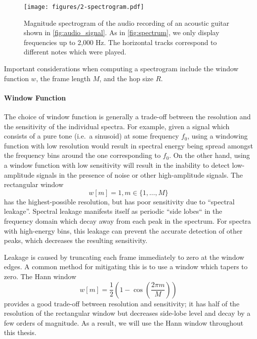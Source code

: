 \begin{figure}
  \centering
  \texttt{[image: figures/2-spectrogram.pdf]}
  \caption[Magnitude spectrogram of the acoustic guitar recording]{Magnitude spectrogram of the audio recording of an acoustic guitar shown in \cref{fig:audio_signal}.
  As in \cref{fig:spectrum}, we only display frequencies up to 2,000 Hz.
  The horizontal tracks correspond to different notes which were played.}
  \label{fig:spectrogram}
\end{figure}

Important considerations when computing a spectrogram include the window function $w$, the frame length $M$, and the hop size $R$.

\paragraph{Window Function}

The choice of window function is generally a trade-off between the resolution and the sensitivity of the individual spectra.
For example, given a signal which consists of a pure tone (i.e.\ a sinusoid) at some frequency $f_0$, using a windowing function with low resolution would result in spectral energy being spread amongst the frequency bins around the one corresponding to $f_0$.
On the other hand, using a window function with low sensitivity will result in the inability to detect low-amplitude signals in the presence of noise or other high-amplitude signals.
The rectangular window
\begin{equation}
        w[m] = 1, m \in \{1, \ldots, M\}
\end{equation}
has the highest-possible resolution, but has poor sensitivity due to ``spectral leakage''.
Spectral leakage manifests itself as periodic ``side lobes`` in the frequency domain which decay away from each peak in the spectrum.
For spectra with high-energy bins, this leakage can prevent the accurate detection of other peaks, which decreases the resulting sensitivity.

Leakage is caused by truncating each frame immediately to zero at the window edges.
A common method for mitigating this is to use a window which tapers to zero.
The Hann window
\begin{equation}
        w[m] = \frac{1}{2}\left(1 - \cos\left(\frac{2\pi m}{M}\right)\right)
\end{equation}
provides a good trade-off between resolution and sensitivity; it has half of the resolution of the rectangular window but decreases side-lobe level and decay by a few orders of magnitude.
As a result, we will use the Hann window throughout this thesis.

